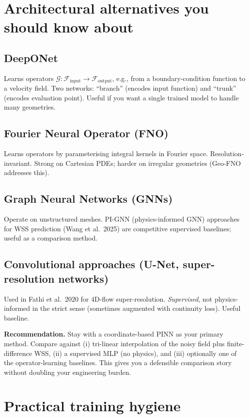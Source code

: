 \documentclass[11pt]{article}
\begin{document}
\section{Architectural alternatives you should know about}

\subsection*{DeepONet}
Learns operators $\mathcal{G}: \mathcal{F}_{\text{input}} \to \mathcal{F}_{\text{output}}$, e.g., from a boundary-condition function to a velocity field. Two networks: ``branch'' (encodes input function) and ``trunk'' (encodes evaluation point). Useful if you want a single trained model to handle many geometries.

\subsection*{Fourier Neural Operator (FNO)}
Learns operators by parameterising integral kernels in Fourier space. Resolution-invariant. Strong on Cartesian PDEs; harder on irregular geometries (Geo-FNO addresses this).

\subsection*{Graph Neural Networks (GNNs)}
Operate on unstructured meshes. PI-GNN (physics-informed GNN) approaches for WSS prediction (Wang et al.\ 2025) are competitive supervised baselines; useful as a comparison method.

\subsection*{Convolutional approaches (U-Net, super-resolution networks)}
Used in Fathi et al.\ 2020 for 4D-flow super-resolution. \emph{Supervised}, not physics-informed in the strict sense (sometimes augmented with continuity loss). Useful baseline.

\textbf{Recommendation.} Stay with a coordinate-based PINN as your primary method. Compare against (i) tri-linear interpolation of the noisy field plus finite-difference WSS, (ii) a supervised MLP (no physics), and (iii) optionally one of the operator-learning baselines. This gives you a defensible comparison story without doubling your engineering burden.

\section{Practical training hygiene}
\end{document}

